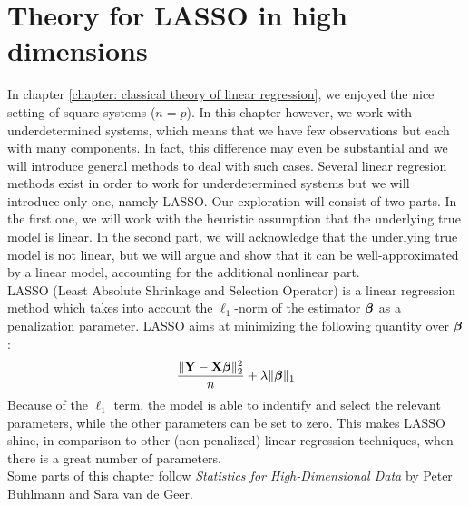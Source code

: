 \chapter{Theory for LASSO in high dimensions}
\label{chapter: LASSO}
In chapter \ref{chapter: classical theory of linear regression}, we enjoyed the nice setting of square systems (\(n = p\)). In this chapter however, we work with underdetermined systems, which means that we have few observations but each with many components. In fact, this difference may even be substantial and we will introduce general methods to deal with such cases. Several linear regresion methods exist in order to work for underdetermined systems but we will introduce only one, namely LASSO. Our exploration will consist of two parts. In the first one, we will work with the heuristic assumption that the underlying true model is linear. In the second part, we will acknowledge that the underlying true model is not linear, but we will argue and show that it can be well-approximated by a linear model, accounting for the additional nonlinear part. \\
LASSO (Least Absolute Shrinkage and Selection Operator) is a linear regression method which takes into account the \(\ell_1\)-norm of the estimator \(\boldsymbol{\beta}\) as a penalization parameter. LASSO aims at minimizing the following quantity over \(\boldsymbol{\beta}\):
\[
    \frac{\|\mathbf{Y}-\mathbf{X} \boldsymbol{\beta}\|_{2}^{2}}{n}+\lambda\|\boldsymbol{\beta}\|_{1}
\]
Because of the \(\ell_1\) term, the model is able to indentify and select the relevant parameters, while the other parameters can be set to zero. This makes LASSO shine, in comparison to other (non-penalized) linear regression techniques, when there is a great number of parameters. \\
Some parts of this chapter follow \textit{Statistics for High-Dimensional Data} by Peter Bühlmann and Sara van de Geer.

